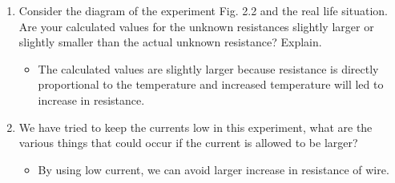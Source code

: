 \documentclass[a4paper]{article}
\begin{document}
\begin{enumerate}
  \item Consider the diagram of the experiment Fig. 2.2 and the real life situation. Are your calculated values for the unknown resistances slightly larger or slightly smaller than the actual unknown resistance? Explain.
  \begin{itemize}
    \item The calculated values are slightly larger because resistance is directly proportional to the temperature and increased temperature will led to increase in resistance.
  \end{itemize}
  \item We have tried to keep the currents low in this experiment, what are the various things that could occur if the current is allowed to be larger?
  \begin{itemize}
    \item By using low current, we can avoid larger increase in resistance of wire.
  \end{itemize}
\end{enumerate}
\end{document}
